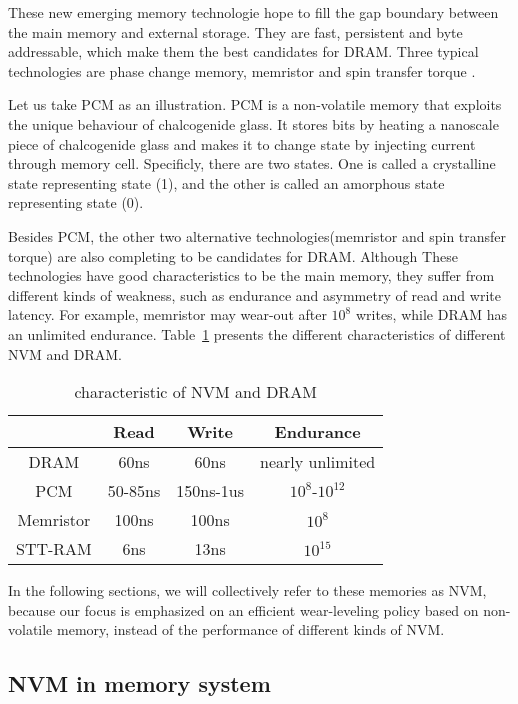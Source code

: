 \documentclass[10pt, conference, compsocconf]{IEEEtran}
\begin{document}
These new emerging memory technologie hope to fill the gap boundary between the main memory and external storage.
They are fast, persistent and byte addressable, which make them the best candidates for DRAM.
Three typical technologies are phase change memory, memristor and spin transfer torque .

Let us take PCM as an illustration. PCM is a non-volatile memory that exploits the unique behaviour of chalcogenide glass.
It stores bits by heating a nanoscale piece of chalcogenide glass and makes it to change state by injecting current through memory cell.
Specificly, there are two states.
One is called a crystalline state representing state (1), and the other is called an amorphous state representing state (0).

Besides PCM, the other two alternative technologies(memristor and spin transfer torque) are also completing to be candidates for DRAM.
Although These technologies have good characteristics to be the main memory, they suffer from different kinds of weakness, such as endurance and asymmetry of read and write latency. 
For example, memristor may wear-out after $10^8$ writes, while DRAM has an unlimited endurance.
Table~\ref{tab:NVMvsDRAM} presents the different characteristics of different NVM and DRAM.

\begin{table}[h]
    \centering
    \begin{tabular}{|c|c|c|c|} \hline
        & Read & Write & Endurance\\ \hline
        DRAM & 60ns & 60ns & nearly unlimited\\ \hline
        PCM & 50-85ns & 150ns-1us & $10^8$-$10^{12}$\\ \hline
        Memristor & 100ns & 100ns & $10^8$\\ \hline
        STT-RAM & 6ns & 13ns & $10^{15}$\\ \hline
    \end{tabular}
    \caption{characteristic of NVM and DRAM}
\label{tab:NVMvsDRAM}
\end{table}


In the following sections, we will collectively refer to these memories as NVM, 
because our focus is emphasized on an efficient wear-leveling policy based on non-volatile memory,
instead of the performance of different kinds of NVM.

\subsection{NVM in memory system}
\end{document}
